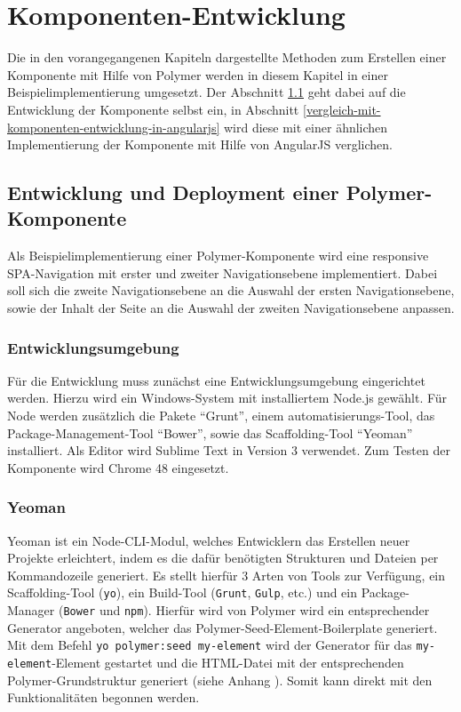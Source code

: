 \chapter{Komponenten-Entwicklung}\label{komponenten-entwicklung}

Die in den vorangegangenen Kapiteln dargestellte Methoden zum Erstellen einer Komponente mit Hilfe von Polymer werden in diesem Kapitel in einer Beispielimplementierung umgesetzt. Der Abschnitt \ref{entwicklung-und-deployment-einer-polymer-komponente} geht dabei auf die Entwicklung der Komponente selbst ein, in Abschnitt \ref{vergleich-mit-komponenten-entwicklung-in-angularjs} wird diese mit einer ähnlichen Implementierung der Komponente mit Hilfe von AngularJS verglichen.


\section{Entwicklung und Deployment einer Polymer-Komponente}\label{entwicklung-und-deployment-einer-polymer-komponente}

Als Beispielimplementierung einer Polymer-Komponente wird eine responsive \ac{SPA}-Navigation mit erster und zweiter Navigationsebene implementiert. Dabei soll sich die zweite Navigationsebene an die Auswahl der ersten Navigationsebene, sowie der Inhalt der Seite an die Auswahl der zweiten Navigationsebene anpassen.


\subsection{Entwicklungsumgebung}\label{entwicklungsumgebung}

Für die Entwicklung muss zunächst eine Entwicklungsumgebung eingerichtet werden. Hierzu wird ein Windows-System mit installiertem Node.js gewählt. Für Node werden zusätzlich die Pakete ``Grunt'', einem automatisierungs-Tool, das Package-Management-Tool ``Bower'', sowie das Scaffolding-Tool ``Yeoman'' installiert. Als Editor wird Sublime Text in Version 3 verwendet. Zum Testen der Komponente wird Chrome 48 eingesetzt.


\subsection{Yeoman}\label{yeoman}

Yeoman \cite{citeulike:13916358} ist ein Node-\ac{CLI}-Modul, welches Entwicklern das Erstellen neuer Projekte erleichtert, indem es die dafür benötigten Strukturen und Dateien per Kommandozeile generiert. Es stellt hierfür 3 Arten von Tools zur Verfügung, ein Scaffolding-Tool (\texttt{yo}), ein Build-Tool (\texttt{Grunt}, \texttt{Gulp}, etc.) und ein Package-Manager (\texttt{Bower} und \texttt{npm}). Hierfür wird von Polymer wird ein entsprechender Generator angeboten, welcher das Polymer-Seed-Element-Boilerplate generiert. Mit dem Befehl \texttt{yo\ polymer:seed\ my-element} wird der Generator für das \texttt{my-element}-Element gestartet und die \ac{HTML}-Datei mit der entsprechenden Polymer-Grundstruktur generiert (siehe Anhang ). Somit kann direkt mit den Funktionalitäten begonnen werden.


